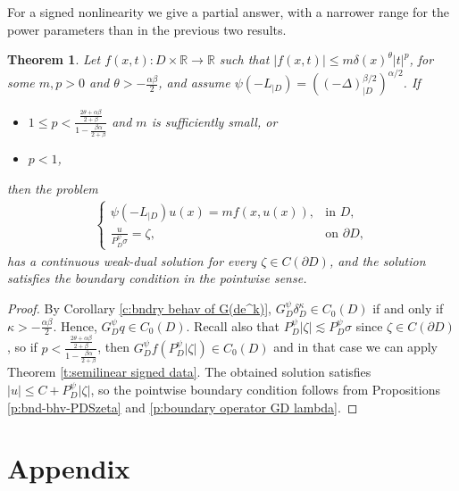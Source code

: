 \documentclass[12pt,a4paper,onecolumn]{article}
\newtheorem{thm}{Theorem}[section]
\theoremstyle{definition}
\newcommand{\R}{\mathbb{R}}
\newcommand{\1}{\mathbf 1}
\newcommand{\de}{\delta_D}
\newcommand{\Lo}{\psi(-L_{|D})}
\newcommand{\INTFR}{\left((-\Delta)^{\beta/2}_{|D}\right)^{\alpha/2}}
\newcommand{\GDP}{G_D^\psi}
\newcommand{\PDS}{P^{\psi}_{ D}}
\numberwithin{equation}{section}
\begin{document}
	
	For a signed nonlinearity we give a partial answer, with a narrower range for the power parameters than in the previous two results.
	\begin{thm}\label{t:frac-semi-sign}
		Let $f(x,t):D\times \R\to \R$ such that $|f(x,t)|\le m\delta(x)^\theta|t|^p$, for some $m,p>0$ and $\theta> -\frac{\alpha\beta}{2}$, and assume  $\Lo=\INTFR$. If 
		\begin{itemize}
			\item $1\le p<\frac{\frac{2\theta+\alpha\beta}{2+\beta}}{1-\frac{\beta\alpha}{2+\beta}}$ and $m$ is sufficiently small, or
			\item $p<1$,
		\end{itemize}
		then the problem
		\begin{align*}
			\begin{cases}
				\Lo u(x)=mf(x,u(x)),&\textrm{in $D$},\\
				\frac{u}{\PDS\sigma}=\zeta,&\textrm{on $\partial D$},
			\end{cases}
		\end{align*}
		has a  continuous weak-dual solution for every  $\zeta\in C(\partial D)$, and the solution satisfies the boundary condition in the pointwise sense.
	\end{thm}
	\begin{proof}
		By Corollary \ref{c:bndry behav of G(de^k)}, $\GDP \de^\kappa \in C_0(D)$ if and only if $\kappa > -\frac{\alpha\beta}{2}$. Hence, $\GDP q\in C_0(D)$. Recall also that $\PDS|\zeta|\lesssim \PDS\sigma$ since $\zeta \in C(\partial D)$, so if $p<\frac{\frac{2\theta+\alpha\beta}{2+\beta}}{1-\frac{\beta\alpha}{2+\beta}}$, then $\GDP f(\PDS |\zeta|)\in C_0(D)$ and in that case we can apply Theorem \ref{t:semilinear signed data}. The obtained solution satisfies $|u|\le C+\PDS|\zeta|$, so the pointwise boundary condition follows from Propositions \ref{p:bnd-bhv-PDSzeta} and \ref{p:boundary operator GD lambda}.
	\end{proof}
	
	
\appendix
    \section{Appendix}
\end{document}
